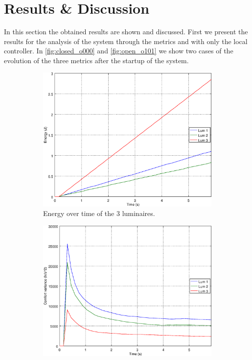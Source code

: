 \section{Results \& Discussion}\label{results}


In this section the obtained results are shown and discussed. First we present the results for the analysis of the system through the metrics and with only the local controller. In \autoref{fig:closed_o000} and \autoref{fig:open_o101}  we show two cases of the evolution of the three metrics after the startup of the system.

\begin{figure}[ht]
    \centering
    \begin{subfigure}[t]{0.32\textwidth}
    \centering
    \includegraphics[width=.95\textwidth]{img/e_closed_o000}
    \caption{Energy over time of the 3 luminaires.}
    \label{fig:e_closed_o000}
    \end{subfigure}
    \begin{subfigure}[t]{0.32\textwidth}
    \centering
    \includegraphics[width=.95\textwidth]{img/f_closed_o000}

\end{subfigure}
\end{figure}
